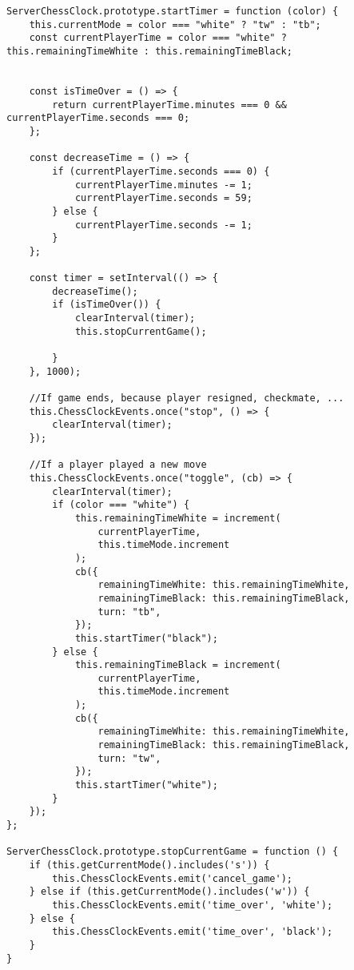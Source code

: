 \begin{lstlisting}[style=codeStyle, caption={Die startTimer und stopCurrentGame Methoden der ServerChessClock Klasse}, label={lst:startTimer}]
ServerChessClock.prototype.startTimer = function (color) {
    this.currentMode = color === "white" ? "tw" : "tb";
    const currentPlayerTime = color === "white" ? this.remainingTimeWhite : this.remainingTimeBlack;


    const isTimeOver = () => {
        return currentPlayerTime.minutes === 0 && currentPlayerTime.seconds === 0;
    };

    const decreaseTime = () => {
        if (currentPlayerTime.seconds === 0) {
            currentPlayerTime.minutes -= 1;
            currentPlayerTime.seconds = 59;
        } else {
            currentPlayerTime.seconds -= 1;
        }
    };

    const timer = setInterval(() => {
        decreaseTime();
        if (isTimeOver()) {
            clearInterval(timer);
            this.stopCurrentGame();

        }
    }, 1000);
    
	//If game ends, because player resigned, checkmate, ...
    this.ChessClockEvents.once("stop", () => {
        clearInterval(timer);
    });
    
    //If a player played a new move
    this.ChessClockEvents.once("toggle", (cb) => {
        clearInterval(timer);
        if (color === "white") {
            this.remainingTimeWhite = increment(
                currentPlayerTime,
                this.timeMode.increment
            );
            cb({
                remainingTimeWhite: this.remainingTimeWhite,
                remainingTimeBlack: this.remainingTimeBlack,
                turn: "tb",
            });
            this.startTimer("black");
        } else {
            this.remainingTimeBlack = increment(
                currentPlayerTime,
                this.timeMode.increment
            );
            cb({
                remainingTimeWhite: this.remainingTimeWhite,
                remainingTimeBlack: this.remainingTimeBlack,
                turn: "tw",
            });
            this.startTimer("white");
        }
    });
};

ServerChessClock.prototype.stopCurrentGame = function () {
    if (this.getCurrentMode().includes('s')) {
        this.ChessClockEvents.emit('cancel_game');
    } else if (this.getCurrentMode().includes('w')) {
        this.ChessClockEvents.emit('time_over', 'white');
    } else {
        this.ChessClockEvents.emit('time_over', 'black');
    }
}
\end{lstlisting}


